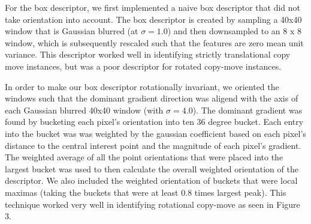 \documentclass[12pt]{article}
\begin{document}
For the box descriptor, we first implemented a naive box descriptor that did not take orientation into account. The box descriptor is created by sampling a 40x40 window that is Gaussian blurred (at $\sigma = 1.0$) and then downsampled to an 8 x 8 window, which is subsequently rescaled such that the features are zero mean unit variance. This descriptor worked well in identifying strictly translational copy move instances, but was a poor descriptor for rotated copy-move instances.

In order to make our box descriptor rotationally invariant, we oriented the windows such that the dominant gradient direction was aligend with the axis of each Gaussian blurred 40x40 window (with $\sigma = 4.0$). The dominant gradient was found by bucketing each pixel's orientation into ten 36 degree bucket. Each entry into the bucket was  was weighted by the gaussian coefficient based on each pixel's distance to the central interest point and the magnitude of each pixel's gradient. The weighted average of all the point orientations that were placed into the largest bucket was used to then calculate the overall weighted orientation of the descriptor. We also included the weighted orientation of buckets that were local maximas (taking the buckets that were at least $0.8$ times largest peak). This technique worked very well in identifying rotational copy-move as seen in Figure 3.
\end{document}
